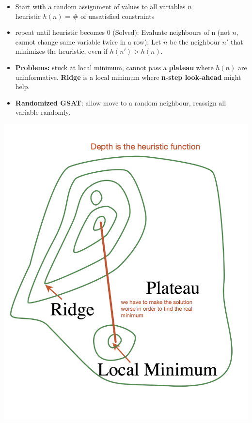 \documentclass{article}
\theoremstyle{note}
\begin{document}
\begin{itemize}
 \begin{minipage}{.85\linewidth}
  \begin{itemize}
    \item Start with a random assignment of values to all variables $n$ \\heuristic $h(n)$ = \# of unsatisfied constraints 
    \item repeat until heuristic becomes 0 (Solved):
    \subitem Evaluate neighbours of n (not $n$, cannot change same variable twice in a row);
    \subitem Let $n$ be  the neighbour $n'$ that minimizes the heuristic, even if $h(n') > h(n)$.
    \item \textbf{Problems:}
   	\subitem stuck at local minimum, cannot pass a \textbf{plateau} where $h(n)$ are uninformative.
   	\subitem \textbf{Ridge} is a local minimum where \textbf{n-step look-ahead} might help.
   	\item \textbf{Randomized GSAT}: allow move to a random neighbour, reassign all variable randomly.
   	\end{itemize}
 \end{minipage}
  \hfill
  \begin{minipage}{.3\linewidth}
  	\includegraphics[width=.9\linewidth]{GSAT.png}
  \end{minipage}
   	

\end{itemize}
\end{document}
